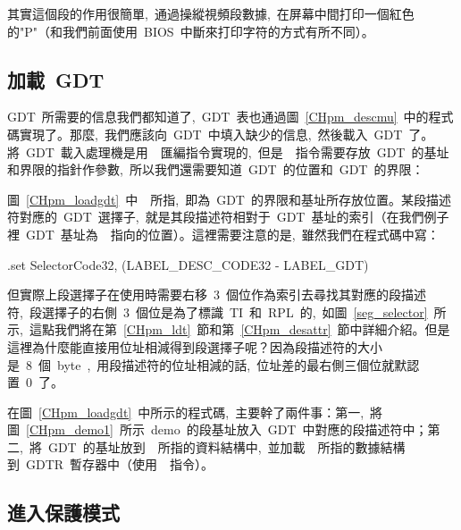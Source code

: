 \label{CHpm_demo1}

其實這個段的作用很簡單,~通過操縱視頻段數據,~在屏幕中間打印一個紅色的"P"（和我們前面使用~BIOS~中斷來打印字符的方式有所不同）。

\subsection{加載~GDT} \label{CHpm_secloadgdt}

GDT~所需要的信息我們都知道了,~GDT~表也通過圖~\ref{CHpm_descmu}~中的程式碼實現了。那麼,~我們應該向~GDT~中填入缺少的信息,~然後載入~GDT~了。將~GDT~載入處理機是用~~匯編指令實現的,~但是~~指令需要存放~GDT~的基址和界限的指針作參數,~所以我們還需要知道~GDT~的位置和~GDT~的界限：

\label{CHpm_loadgdt}

圖~\ref{CHpm_loadgdt}~中~~所指,~即為~GDT~的界限和基址所存放位置。某段描述符對應的~GDT~選擇子,~就是其段描述符相對于~GDT~基址的索引（在我們例子裡~GDT~基址為~~指向的位置）。這裡需要注意的是,~雖然我們在程式碼中寫：

\begin{Command}
.set SelectorCode32, (LABEL_DESC_CODE32 - LABEL_GDT)
\end{Command}
但實際上段選擇子在使用時需要右移~3~個位作為索引去尋找其對應的段描述符,~段選擇子的右側~3~個位是為了標識~TI~和~RPL~的,~如圖~\ref{seg_selector}~所示,~這點我們將在第~\ref{CHpm_ldt}~節和第~\ref{CHpm_desattr}~節中詳細介紹。但是這裡為什麼能直接用位址相減得到段選擇子呢？因為段描述符的大小是~8~個~byte~,~用段描述符的位址相減的話,~位址差的最右側三個位就默認置~0~了。

在圖~\ref{CHpm_loadgdt}~中所示的程式碼,~主要幹了兩件事：第一,~將圖~\ref{CHpm_demo1}~所示~demo~的段基址放入~GDT~中對應的段描述符中；第二,~將~GDT~的基址放到~~所指的資料結構中,~並加載~~所指的數據結構到~GDTR~暫存器中（使用~~指令）。

\subsection{進入保護模式}

